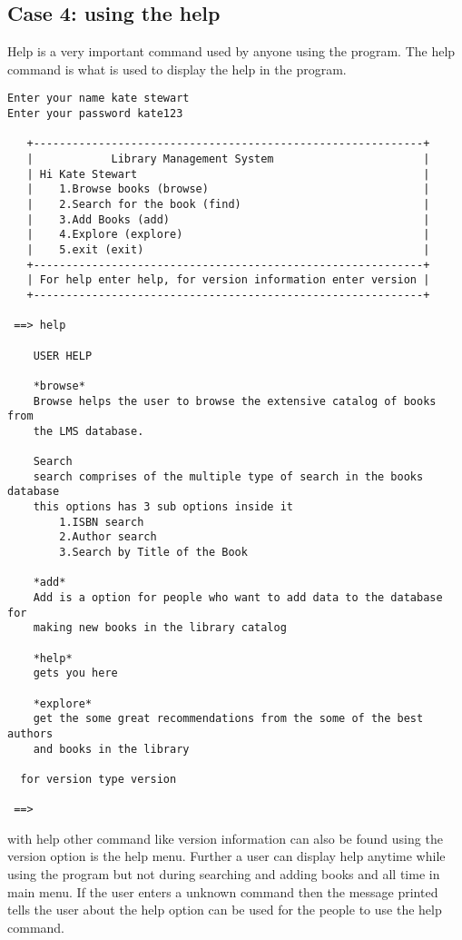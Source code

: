 \documentclass[12pt, a4paper, titlepage, openany]{report}
\begin{document}
\subsection{Case 4: using the help}
Help is a very important command used by anyone using the program. The help command is what is used to display the help in the program.
\begin{verbatim}
Enter your name kate stewart
Enter your password kate123

   +------------------------------------------------------------+
   |            Library Management System                       |
   | Hi Kate Stewart                                            |
   |    1.Browse books (browse)                                 |
   |    2.Search for the book (find)                            |
   |    3.Add Books (add)                                       |
   |    4.Explore (explore)                                     |
   |    5.exit (exit)                                           |
   +------------------------------------------------------------+
   | For help enter help, for version information enter version |
   +------------------------------------------------------------+
    
 ==> help  

    USER HELP
    
    *browse*
    Browse helps the user to browse the extensive catalog of books from
    the LMS database.
    
    Search
    search comprises of the multiple type of search in the books database
    this options has 3 sub options inside it 
        1.ISBN search
        2.Author search
        3.Search by Title of the Book
        
    *add*
    Add is a option for people who want to add data to the database for 
    making new books in the library catalog
    
    *help*
    gets you here
    
    *explore*
    get the some great recommendations from the some of the best authors 
    and books in the library
    
  for version type version 
    
 ==> 

\end{verbatim}
with help other command like version information can also be found using the version option is the help menu. Further a user can display help anytime while using the program but not during searching and adding books and all time in main menu. If the user enters a unknown command then the message printed tells the user about the help option can be used for the people to use the help command.
\newpage
\end{document}
